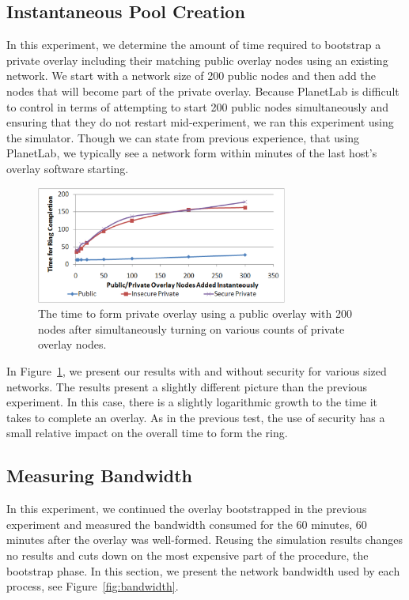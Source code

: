 \documentclass[conference]{IEEEtran}
\begin{document}
\subsection{Instantaneous Pool Creation}
\label{mass_join}
In this experiment, we determine the amount of time required to bootstrap a
private overlay including their matching public overlay nodes using an existing
network.  We start with a network size of 200 public nodes and then add the
nodes that will become part of the private overlay.  Because PlanetLab is
difficult to control in terms of attempting to start 200 public nodes
simultaneously and ensuring that they do not restart mid-experiment, we ran
this experiment using the simulator.  Though we can state from previous
experience, that using PlanetLab, we typically see a network form within
minutes of the last host's overlay software starting.

\begin{figure}[h]
\centering
\includegraphics[width=3.25in]{mass_join.eps}
\caption{The time to form private overlay using a public overlay with 200 nodes
after simultaneously turning on various counts of private overlay nodes.}
\label{fig:big_join}
\end{figure}

In Figure~\ref{fig:big_join}, we present our results with and without security
for various sized networks.  The results present a slightly different picture
than the previous experiment.  In this case, there is a slightly logarithmic
growth to the time it takes to complete an overlay.  As in the previous test,
the use of security has a small relative impact on the overall time to
form the ring.

\subsection{Measuring Bandwidth}
In this experiment, we continued the overlay bootstrapped in the previous
experiment and measured the bandwidth consumed for the 60 minutes, 60 minutes 
after the overlay was well-formed.  Reusing the simulation results changes no
results and cuts down on the most expensive part of the procedure, the bootstrap
phase.  In this section, we present the network bandwidth used by each process, see
Figure~\ref{fig:bandwidth}.
\end{document}
